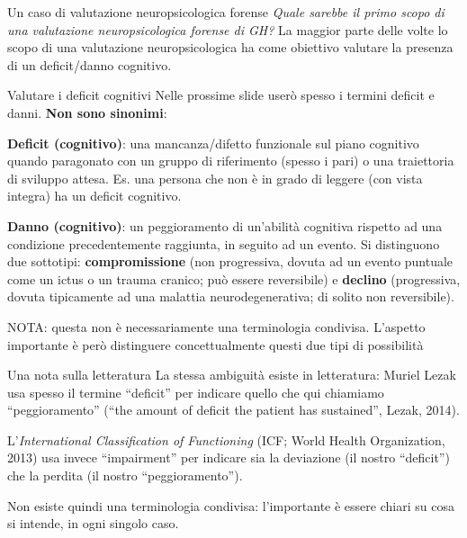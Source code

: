 \documentclass[
  ignorenonframetext,
  aspectratio=169,
]{beamer}
\begin{document}
\begin{frame}{Un caso di valutazione neuropsicologica forense}
\label{un-caso-di-valutazione-neuropsicologica-forense}
\emph{Quale sarebbe il primo scopo di una valutazione neuropsicologica
forense di GH?} \pause \vfill La maggior parte delle volte lo scopo di
una valutazione neuropsicologica ha come obiettivo valutare la presenza
di un deficit/danno cognitivo.
\end{frame}

\begin{frame}{Valutare i deficit cognitivi}
\label{valutare-i-deficit-cognitivi}
Nelle prossime slide userò spesso i termini deficit e danni. \textbf{Non
sono sinonimi}:

\textbf{Deficit (cognitivo)}: una mancanza/difetto funzionale sul piano
cognitivo quando paragonato con un gruppo di riferimento (spesso i pari)
o una traiettoria di sviluppo attesa. Es. una persona che non è in grado
di leggere (con vista integra) ha un deficit cognitivo.

\pause

\textbf{Danno (cognitivo)}: un peggioramento di un'abilità cognitiva
rispetto ad una condizione precedentemente raggiunta, in seguito ad un
evento. Si distinguono due sottotipi: \textbf{compromissione} (non
progressiva, dovuta ad un evento puntuale come un ictus o un trauma
cranico; può essere reversibile) e \textbf{declino} (progressiva, dovuta
tipicamente ad una malattia neurodegenerativa; di solito non
reversibile). \vspace{2em}

\footnotesize

NOTA: questa non è necessariamente una terminologia condivisa. L'aspetto
importante è però distinguere concettualmente questi due tipi di
possibilità
\end{frame}

\begin{frame}{Una nota sulla letteratura}
\label{una-nota-sulla-letteratura}
La stessa ambiguità esiste in letteratura: Muriel Lezak usa spesso il
termine ``deficit'' per indicare quello che qui chiamiamo
``peggioramento'' (``the amount of deficit the patient has sustained'',
Lezak, 2014).

L'\emph{International Classification of Functioning} (ICF; World Health
Organization, 2013) usa invece ``impairment'' per indicare sia la
deviazione (il nostro ``deficit'') che la perdita (il nostro
``peggioramento'').

\vspace{1em}

Non esiste quindi una terminologia condivisa: l'importante è essere
chiari su cosa si intende, in ogni singolo caso.
\end{frame}
\end{document}
